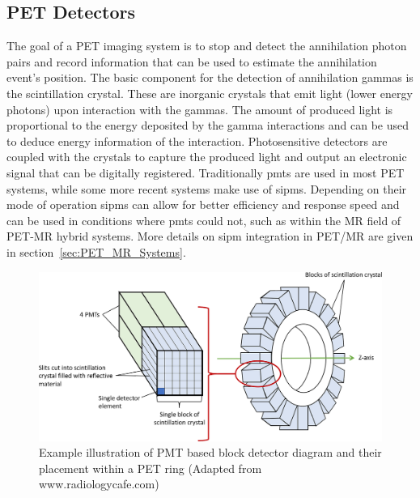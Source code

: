 \subsection{PET Detectors}
The goal of a PET imaging system is to stop and detect the annihilation photon pairs and record information that can be used to estimate the annihilation event's position.
The basic component for the detection of annihilation gammas is the scintillation crystal. These are inorganic crystals that emit light (lower energy photons) upon interaction with the gammas. The amount of produced light is proportional to the energy deposited by the gamma interactions and can be used to deduce energy information of the interaction. Photosensitive detectors are coupled with the crystals to capture the produced light and output an electronic signal that can be digitally registered. Traditionally \glspl{pmt} are used in most PET systems, while some more recent systems make use of \glspl{sipm}. Depending on their mode of operation \glspl{sipm} can allow for better efficiency and response speed and can be used in conditions where \glspl{pmt} could not, such as within the MR field of PET-MR hybrid systems. More details on \gls{sipm} integration in PET/MR are given in section~\ref{sec:PET_MR_Systems}.
%
\begin{figure} [h!]
\centering
\includegraphics[scale=0.28,angle=0]{2_Theory_Methods/figures/block_detector.png}
\caption{Example illustration of PMT based block detector diagram and their placement within a PET ring (Adapted from www.radiologycafe.com) } 
\label{fig_2:BlockDetectorAndRing}
\end{figure} 
